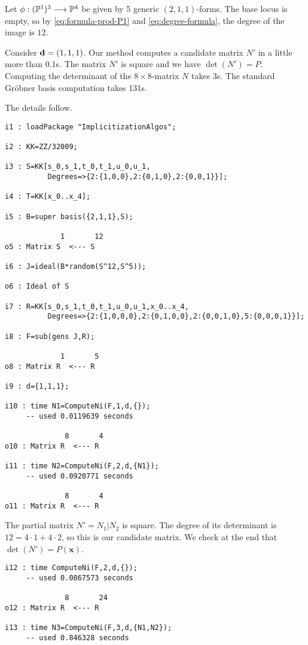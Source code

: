 \documentclass[fleqn,reqno]{amsart}
\begin{document}
\begin{example}[$\mt{ex601}$]
\label{ex601}
Let $\phi:(\mathbb{P}^1)^3\longrightarrow\mathbb{P}^4$ be given by 5 generic $(2,1,1)$-forms.
The base locus is empty,
so by \eqref{eq:formula-prod-P1} and \eqref{eq:degree-formula},
the degree of the image is $12$.

Consider $\mathbf d=(1,1,1)$.
Our method computes a candidate matrix $N'$ in a little more than 0.1s.
The matrix $N'$ is square and we have $\det(N')=P$.
Computing the determinant of the $8\times8$-matrix $N$ takes 3s.
The standard Gr\"obner basis computation takes 131s.

The details follow.
\begin{verbatim}
i1 : loadPackage "ImplicitizationAlgos";

i2 : KK=ZZ/32009;

i3 : S=KK[s_0,s_1,t_0,t_1,u_0,u_1,
          Degrees=>{2:{1,0,0},2:{0,1,0},2:{0,0,1}}];

i4 : T=KK[x_0..x_4];

i5 : B=super basis({2,1,1},S);

             1       12
o5 : Matrix S  <--- S

i6 : J=ideal(B*random(S^12,S^5));

o6 : Ideal of S

i7 : R=KK[s_0,s_1,t_0,t_1,u_0,u_1,x_0..x_4,
          Degrees=>{2:{1,0,0,0},2:{0,1,0,0},2:{0,0,1,0},5:{0,0,0,1}}];

i8 : F=sub(gens J,R);

             1       5
o8 : Matrix R  <--- R

i9 : d={1,1,1};

i10 : time N1=ComputeNi(F,1,d,{});
     -- used 0.0119639 seconds

              8       4
o10 : Matrix R  <--- R

i11 : time N2=ComputeNi(F,2,d,{N1});
     -- used 0.0920771 seconds

              8       4
o11 : Matrix R  <--- R
\end{verbatim}
The partial matrix $N'=N_1|N_2$ is square.
The degree of its determinant is $12=4\cdot1+4\cdot2$, so this is our candidate matrix.
We check at the end that $\det(N')=P(\mathbf x)$.
\begin{verbatim}
i12 : time ComputeNi(F,2,d,{});
     -- used 0.0867573 seconds

              8       24
o12 : Matrix R  <--- R

i13 : time N3=ComputeNi(F,3,d,{N1,N2});
     -- used 0.846328 seconds


\end{verbatim}
\end{example}
\end{document}
